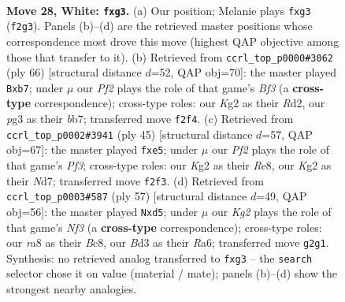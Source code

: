 \documentclass[11pt]{article}
\begin{document}
\clearpage

\begin{figure}[p]\centering
\begin{subfigure}{0.46\textwidth}\centering
\resizebox{\linewidth}{!}{%
\newchessgame
\chessboard[
  setfen={rn6/3bk3/1p2p3/p3P3/P5r1/1PNB2p1/5PK1/R2R4 w - - 0 28},
  showmover=false,
  pgfstyle=straightmove, color=movearrow, markmove={f2-g3}
]}
\caption{}
\end{subfigure}\hfill
\begin{subfigure}{0.46\textwidth}\centering
\resizebox{\linewidth}{!}{%
\newchessgame
\chessboard[
  setfen={8/1b3pk1/1r4p1/2r3P1/3p3p/4PB1P/R2R1P1K/8 w - - 0 34},
  showmover=false,
  pgfstyle=straightmove, color=movearrow, markmove={f3-b7}
]}
\caption{}
\end{subfigure}
\\[4pt]
\begin{subfigure}{0.46\textwidth}\centering
\resizebox{\linewidth}{!}{%
\newchessgame
\chessboard[
  setfen={4rrk1/3n2p1/5pp1/p3P3/P2Pp3/1R4P1/1P5P/2B1R2K b - - 0 23},
  showmover=false,
  pgfstyle=straightmove, color=movearrow, markmove={f6-e5}
]}
\caption{}
\end{subfigure}\hfill
\begin{subfigure}{0.46\textwidth}\centering
\resizebox{\linewidth}{!}{%
\newchessgame
\chessboard[
  setfen={r1b3k1/5p2/r1p2np1/1pPP4/1P6/1R1B1N2/5PP1/4R1K1 b - - 0 29},
  showmover=false,
  pgfstyle=straightmove, color=movearrow, markmove={f6-d5}
]}
\caption{}
\end{subfigure}
\caption{\textbf{Move 28, White: \texttt{fxg3}.} (a) Our position; Melanie plays \texttt{fxg3} (\texttt{f2g3}). Panels (b)--(d) are the retrieved master positions whose correspondence most drove this move (highest QAP objective among those that transfer to it). (b) Retrieved from \texttt{ccrl\_top\_p0000\#3062} (ply 66) [structural distance $d$=52, QAP obj=70]: the master played \texttt{Bxb7}; under $\mu$ our \emph{Pf2} plays the role of that game's \emph{Bf3} (a \textbf{cross-type} correspondence); cross-type roles: our \emph{K}g2 as their \emph{R}d2, our \emph{p}g3 as their \emph{b}b7; transferred move \texttt{f2f4}. (c) Retrieved from \texttt{ccrl\_top\_p0002\#3941} (ply 45) [structural distance $d$=57, QAP obj=67]: the master played \texttt{fxe5}; under $\mu$ our \emph{Pf2} plays the role of that game's \emph{Pf3}; cross-type roles: our \emph{K}g2 as their \emph{R}e8, our \emph{K}g2 as their \emph{N}d7; transferred move \texttt{f2f3}. (d) Retrieved from \texttt{ccrl\_top\_p0003\#587} (ply 57) [structural distance $d$=49, QAP obj=56]: the master played \texttt{Nxd5}; under $\mu$ our \emph{Kg2} plays the role of that game's \emph{Nf3} (a \textbf{cross-type} correspondence); cross-type roles: our \emph{r}a8 as their \emph{B}c8, our \emph{B}d3 as their \emph{R}a6; transferred move \texttt{g2g1}. Synthesis: no retrieved analog transferred to \texttt{fxg3} -- the \texttt{search} selector chose it on value (material / mate); panels (b)--(d) show the strongest nearby analogies.}
\label{fig:thought-m54}
\end{figure}
\end{document}
